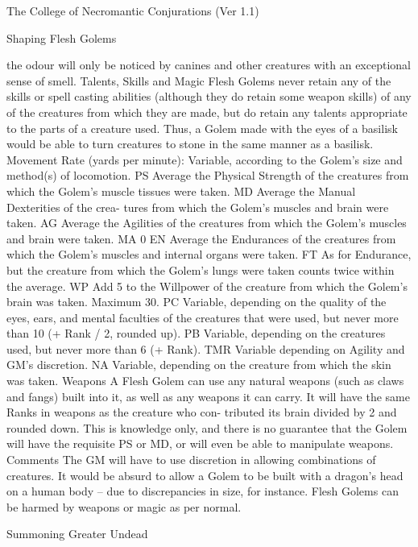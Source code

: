 \begin{Chapter}{The College of Necromantic Conjurations (Ver 1.1)}
\begin{ritual}[R-4]{Shaping Flesh Golems }
\begin{effects}
the odour will only be noticed by canines and other 
creatures with an exceptional sense of smell. 
Talents, Skills and Magic Flesh Golems never 
retain any of the skills or spell casting abilities 
(although they do retain some weapon skills) of 
any of the creatures from which they are made, but 
do retain any talents appropriate to the parts of a 
creature used. Thus, a Golem made with the eyes 
of a basilisk would be able to turn creatures to 
stone in the same manner as a basilisk. 
Movement Rate (yards per minute): Variable, 
according to the Golem’s size and method(s) of 
locomotion. 
PS Average the Physical Strength of the creatures 
from which the Golem’s muscle tissues were taken. 
MD Average the Manual Dexterities of the crea-
tures from which the Golem’s muscles and brain 
were taken. 
AG Average the Agilities of the creatures from 
which the Golem’s muscles and brain were taken. 
MA 0 
EN Average the Endurances of the creatures from 
which the Golem’s muscles and internal organs 
were taken. 
FT As for Endurance, but the creature from which 
the Golem’s lungs were taken counts twice within 
the average. 
WP Add 5 to the Willpower of the creature from 
which the Golem’s brain was taken. Maximum 30. 
PC Variable, depending on the quality of the eyes, 
ears, and mental faculties of the creatures that were 
used, but never more than 10 (+ Rank / 2, rounded 
up). 
PB Variable, depending on the creatures used, but 
never more than 6 (+ Rank). 
TMR Variable depending on Agility and GM’s 
discretion. 
NA Variable, depending on the creature from 
which the skin was taken. 
Weapons A Flesh Golem can use any natural 
weapons (such as claws and fangs) built into it, as 
well as any weapons it can carry. It will have the 
same Ranks in weapons as the creature who con-
tributed its brain divided by 2 and rounded down. 
This is knowledge only, and there is no guarantee 
that the Golem will have the requisite PS or MD, 
or will even be able to manipulate weapons. 
Comments  The  GM will have to use discretion in 
allowing  combinations  of  creatures.  It  would  be 
absurd to allow a Golem to be built with a dragon’s 
head  on  a  human  body  –  due  to  discrepancies  in 
size, for instance. Flesh Golems can be harmed by 
weapons or magic as per normal. 

\end{effects}
\end{ritual}

\begin{ritual}[R-5]{Summoning Greater Undead }


\end{ritual}
\end{Chapter}
